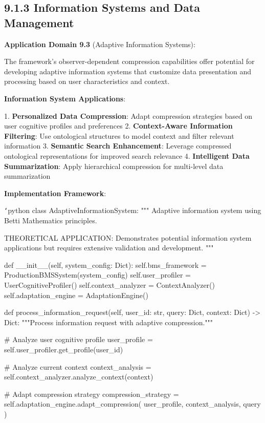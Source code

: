 \subsection{9.1.3 Information Systems and Data Management}

\textbf{Application Domain 9.3} (Adaptive Information Systems):

The framework's observer-dependent compression capabilities offer potential for developing adaptive information systems that customize data presentation and processing based on user characteristics and context.

\textbf{Information System Applications}:

1. \textbf{Personalized Data Compression}: Adapt compression strategies based on user cognitive profiles and preferences
2. \textbf{Context-Aware Information Filtering}: Use ontological structures to model context and filter relevant information
3. \textbf{Semantic Search Enhancement}: Leverage compressed ontological representations for improved search relevance
4. \textbf{Intelligent Data Summarization}: Apply hierarchical compression for multi-level data summarization

\textbf{Implementation Framework}:

\texttt{`}python
class AdaptiveInformationSystem:
    """
    Adaptive information system using Betti Mathematics principles.
    
    THEORETICAL APPLICATION: Demonstrates potential information system
    applications but requires extensive validation and development.
    """
    
    def __init__(self, system_config: Dict):
        self.bms_framework = ProductionBMSSystem(system_config)
        self.user_profiler = UserCognitiveProfiler()
        self.context_analyzer = ContextAnalyzer()
        self.adaptation_engine = AdaptationEngine()
        
    def process_information_request(self, user_id: str, query: Dict, 
                                  context: Dict) -> Dict:
        """Process information request with adaptive compression."""
        
        \# Analyze user cognitive profile
        user_profile = self.user_profiler.get_profile(user_id)
        
        \# Analyze current context
        context_analysis = self.context_analyzer.analyze_context(context)
        
        \# Adapt compression strategy
        compression_strategy = self.adaptation_engine.adapt_compression(
            user_profile, context_analysis, query
        )
        
